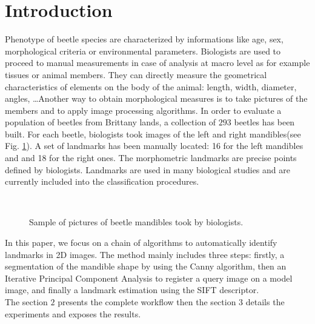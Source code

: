 \documentclass[twoside,twocolumn,10pt]{article}
\begin{document}


\section{Introduction}

\copyrightspace
  Phenotype of beetle species are characterized by informations like
  age, sex, morphological criteria or environmental parameters. Biologists are
  used to proceed to manual measurements in case of
  analysis at macro level as for example tissues or animal members.
  They can directly measure the geometrical characteristics of elements on the body of the animal: length,
  width, diameter, angles, \ldots Another way to obtain morphological
  measures is to take pictures of the members and to apply image processing algorithms. In order to
  evaluate a population of beetles from Brittany lands, a collection of
  $293$ beetles has been built. For each beetle, biologists took images of the left
  and right mandibles(see Fig. \ref{figparts}). A set of landmarks has been manually located:
  16 for the left mandibles and and 18 for the right ones. The
  morphometric landmarks are precise points defined by
  biologists. Landmarks are used in many biological studies and are currently included
into the classification procedures.

\begin{figure}[h]
\centering
{}~~
\caption{Sample of pictures of beetle mandibles took by biologists.}
\label{figparts}
\end{figure}

In this paper, we focus on a chain of algorithms to automatically identify  landmarks in 2D images. The method
mainly includes three steps: firstly, a segmentation of the mandible
shape by using the Canny algorithm, then an Iterative Principal
Component Analysis to register a query image on a model image, and
finally a landmark estimation using the SIFT descriptor.\\
The section $2$ presents the complete workflow then the section $3$ details the experiments and exposes the results. 
\end{document}
